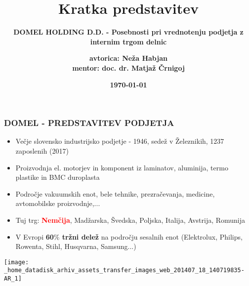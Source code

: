 \documentclass{beamer}
\title{Kratka predstavitev}
\subtitle{\textbf{DOMEL HOLDING D.D. - Posebnosti pri vrednotenju podjetja z internim trgom delnic}}
\author{\textbf{avtorica: Neža Habjan\\
mentor: doc. dr. Matjaž Črnigoj}}
\institute{\textbf{Fakulteta za matematiko in fiziko}}
\date{\textbf{\today}}
\begin{document}
\begin{frame}
\titlepage
\tableofcontents
\end{frame}

\begin{frame}
\frametitle{DOMEL - PREDSTAVITEV PODJETJA}
\begin{itemize}
\item Večje slovensko industrijsko podjetje - 1946, sedež v Železnikih, 1237 zaposlenih (2017)
\item Proizvodnja el. motorjev in komponent iz laminatov, aluminija, termo plastike in BMC duroplasta
\item Področje vakuumskih enot, bele tehnike, prezračevanja, medicine, avtomobilske proizvodnje,...  %
\item Tuj trg: \textbf{\textcolor{red}{Nemčija}}, Madžarska, Švedska, Poljska, Italija, Avstrija, Romunija %
\item V Evropi \textbf{60$\%$ tržni delež} na področju sesalnih enot (Elektrolux, Philips, Rowenta, Stihl, Husqvarna, Samsung...) %
\end{itemize}
\end{frame}


\begin{frame}
\begin{center}
\texttt{[image: \_home\_datadisk\_arhiv\_assets\_transfer\_images\_web\_201407\_18\_140719835-AR\_1]}
\end{center}
\end{frame}


\end{document}
